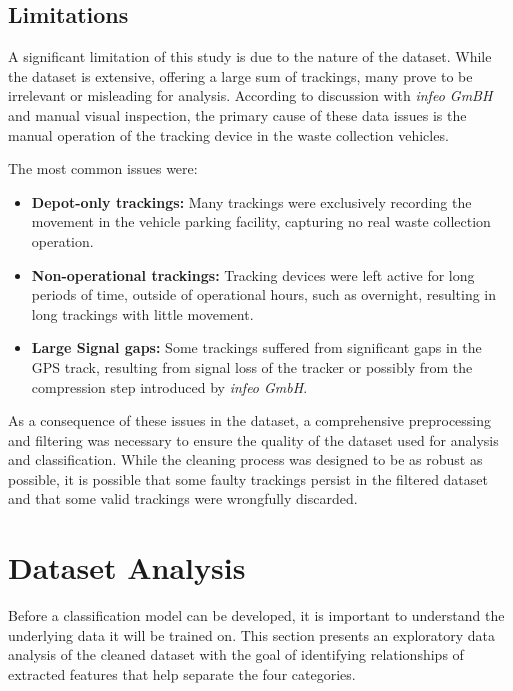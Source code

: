 \documentclass[a4paper,12pt,twoside]{scrreprt}
\begin{document}
\subsection{Limitations}

A significant limitation of this study is due to the nature of the dataset.
While the dataset is extensive, offering a large sum of trackings, many prove
to be irrelevant or misleading for analysis.
According to discussion with \textit{infeo GmBH} and manual visual inspection,
the primary cause of these data issues is the manual operation of the tracking
device in the waste collection vehicles.

The most common issues were:

\begin{itemize}
  \item \textbf{Depot-only trackings:} Many trackings were exclusively
        recording the movement in the vehicle parking facility, capturing no
        real waste
        collection operation.
  \item \textbf{Non-operational trackings:} Tracking devices were left active
        for long periods of time, outside of operational hours, such as
        overnight,
        resulting in long trackings with little movement.
  \item \textbf{Large Signal gaps:} Some trackings suffered from significant
        gaps in the GPS track, resulting from signal loss of the tracker or
        possibly from the compression step introduced by \textit{infeo GmbH}.
\end{itemize}

As a consequence of these issues in the dataset, a comprehensive preprocessing
and filtering was necessary to ensure the quality of the dataset used for
analysis and
classification.
While the cleaning process was designed to be as robust as possible, it is
possible that some faulty trackings persist in the filtered dataset and that
some valid trackings were wrongfully discarded.

\section{Dataset Analysis}
Before a classification model can be developed, it is important to understand
the underlying data it will be trained on.
This section presents an exploratory data analysis of the cleaned dataset with
the goal of identifying relationships of extracted features that help separate
the
four categories.
\end{document}
